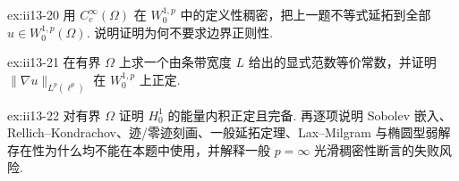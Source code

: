 \begin{FAExercise}{ex:ii13-20}
用 \(\displaystyle C_c^\infty(\Omega)\) 在 \(\displaystyle W_0^{1,p}\) 中的定义性稠密，把上一题不等式延拓到全部 \(\displaystyle u\in W_0^{1,p}(\Omega)\). 说明证明为何不要求边界正则性.
\end{FAExercise}

\begin{FAExercise}[梯度范数等价]{ex:ii13-21}
在有界 \(\displaystyle\Omega\) 上求一个由条带宽度 \(\displaystyle L\) 给出的显式范数等价常数，并证明 \(\displaystyle\|\nabla u\|_{L^p(\ell^p)}\) 在 \(\displaystyle W_0^{1,p}\) 上正定.
\end{FAExercise}

\begin{FAExercise}{ex:ii13-22}
对有界 \(\displaystyle\Omega\) 证明 \(\displaystyle H_0^1\) 的能量内积正定且完备. 再逐项说明 Sobolev 嵌入、Rellich--Kondrachov、迹/零迹刻画、一般延拓定理、Lax--Milgram 与椭圆型弱解存在性为什么均不能在本题中使用，并解释一般 \(\displaystyle p=\infty\) 光滑稠密性断言的失败风险.
\end{FAExercise}
